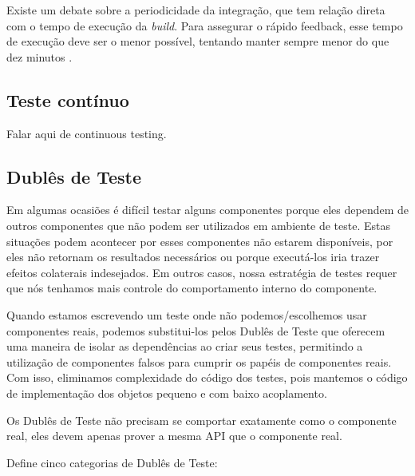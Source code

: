 Existe um debate sobre a periodicidade da integração, que tem relação direta com o tempo de execução da \textit{build}. Para assegurar o rápido feedback, esse tempo de execução deve ser o menor possível, tentando manter sempre menor do que dez minutos \cite{FowlerCI}.

\subsection{Teste contínuo}
\label{sub:teste_continuo}

Falar aqui de continuous testing.

\subsection{Dublês de Teste}

Em algumas ocasiões é difícil testar alguns componentes porque eles dependem de outros componentes que não podem ser utilizados em ambiente de teste. Estas situações podem acontecer por esses componentes não estarem disponíveis, por eles não retornam os resultados necessários ou porque executá-los iria trazer efeitos colaterais indesejados. Em outros casos, nossa estratégia de testes requer que nós tenhamos mais controle do comportamento interno do componente.

Quando estamos escrevendo um teste onde não podemos/escolhemos usar componentes reais, podemos substitui-los pelos Dublês de Teste que oferecem uma maneira de isolar as dependências ao criar seus testes, permitindo a utilização de componentes falsos para cumprir os papéis de componentes reais. Com isso, eliminamos complexidade do código dos testes, pois mantemos o código de implementação dos objetos pequeno e com baixo acoplamento.

Os Dublês de Teste não precisam se comportar exatamente como o componente real, eles devem apenas prover a mesma API que o componente real.

 Define cinco categorias de Dublês de Teste:

